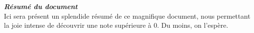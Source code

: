 \thispagestyle{empty}
\vspace*{10mm}

\textbf{\emph{\textcolor{epiBlue}{\large{Résumé du document} } } }\\

Ici sera présent un splendide résumé de ce magnifique document, nous permettant la joie intense de découvrir une note supérieure à 0. Du moins, on l'espère.

\newpage
